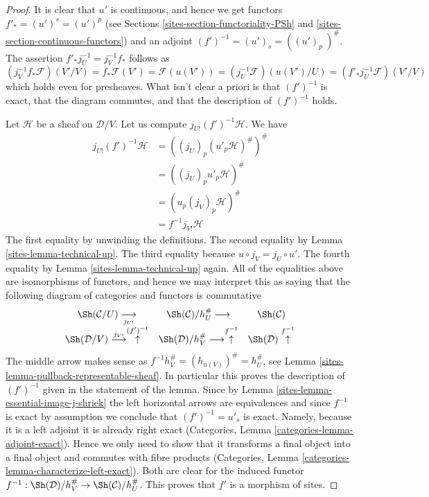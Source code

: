 \begin{proof}

It is clear that $u'$ is continuous, and hence we get functors
$f'_* = (u')^s = (u')^p$ (see
Sections \ref{sites-section-functoriality-PSh}
and \ref{sites-section-continuous-functors})
and an adjoint $(f')^{-1} = (u')_s = ((u')_p\ )^\#$. The assertion
$f'_*j_U^{-1} = j_V^{-1}f_*$ follows as
$$
(j_V^{-1}f_*\mathcal{F})(V'/V)
= f_*\mathcal{F}(V') = \mathcal{F}(u(V'))
= (j_U^{-1}\mathcal{F})(u(V')/U)
= (f'_*j_U^{-1}\mathcal{F})(V'/V)
$$
which holds even for presheaves. What isn't clear a priori is
that $(f')^{-1}$ is exact, that the diagram commutes, and that
the description of $(f')^{-1}$ holds.

\medskip\noindent
Let $\mathcal{H}$ be a sheaf on $\mathcal{D}/V$.
Let us compute $j_{U!}(f')^{-1}\mathcal{H}$. We have
\begin{eqnarray*}
j_{U!}(f')^{-1}\mathcal{H}
& =
((j_U)_p(u'_p\mathcal{H})^\#)^\# \\
& =
((j_U)_pu'_p\mathcal{H})^\# \\
& =
(u_p(j_V)_p\mathcal{H})^\# \\
& =
f^{-1}j_{V!}\mathcal{H}
\end{eqnarray*}
The first equality by unwinding the definitions.
The second equality by Lemma \ref{sites-lemma-technical-up}.
The third equality because $u \circ j_V = j_U \circ u'$.
The fourth equality by Lemma \ref{sites-lemma-technical-up} again.
All of the equalities above are isomorphisms of functors, and
hence we may interpret this as saying that the following
diagram of categories and functors is commutative
$$
\begin{array}{ccc}\Sh(\mathcal{C}/U) \underset{j_{U!}}{\longrightarrow} & \Sh(\mathcal{C})/h_U^\# \longrightarrow & \Sh(\mathcal{C}) \\ \Sh(\mathcal{D}/V) \overset{j_{V!}}{\longrightarrow}\overset{(f')^{-1}}{\uparrow} & \Sh(\mathcal{D})/h_V^\# \longrightarrow\overset{f^{-1}}{\uparrow} & \Sh(\mathcal{D}) \overset{f^{-1}}{\uparrow}\end{array}
$$
The middle arrow makes sense as $f^{-1}h_V^\# = (h_{u(V)})^\# = h_U^\#$, see
Lemma \ref{sites-lemma-pullback-representable-sheaf}.
In particular this proves the description of $(f')^{-1}$ given
in the statement of the lemma.
Since by
Lemma \ref{sites-lemma-essential-image-j-shriek}
the left horizontal arrows are equivalences
and since $f^{-1}$ is exact by assumption we conclude that
$(f')^{-1} = u'_s$ is exact. Namely, because it is a left adjoint
it is already right exact
(Categories, Lemma \ref{categories-lemma-adjoint-exact}).
Hence we only need to show that
it transforms a final object into a final object and commutes
with fibre products
(Categories, Lemma \ref{categories-lemma-characterize-left-exact}).
Both are clear for the induced functor
$f^{-1} : \Sh(\mathcal{D})/h_V^\# \to \Sh(\mathcal{C})/h_U^\#$.
This proves that $f'$ is a morphism of sites.


\end{proof}

